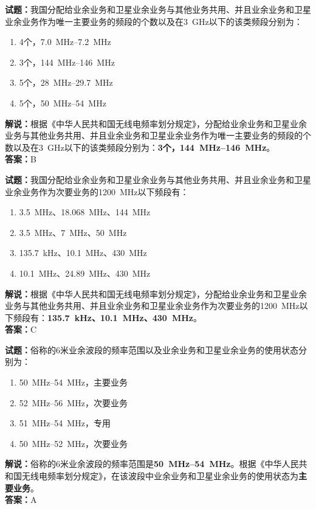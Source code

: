 \documentclass{ctexbook}
\begin{document}
\vspace{\baselineskip}

\noindent\textbf{试题：}我国分配给业余业务和卫星业余业务与其他业务共用、并且业余业务和卫星业余业务作为唯一主要业务的频段的个数以及在\qty{3}{\GHz}以下的该类频段分别为：
\begin{enumerate}[leftmargin=3em]
  \item 4个，\qtyrange[range-phrase=--]{7.0}{7.2}{\MHz}
  \item 3个，\qtyrange[range-phrase=--]{144}{146}{\MHz}
  \item 5个，\qtyrange[range-phrase=--]{28}{29.7}{\MHz}
  \item 5个，\qtyrange[range-phrase=--]{50}{54}{\MHz}
\end{enumerate}
\noindent\textbf{解说：}根据《中华人民共和国无线电频率划分规定》，分配给业余业务和卫星业余业务与其他业务共用、并且业余业务和卫星业余业务作为唯一主要业务的频段的个数以及在\qty{3}{\GHz}以下的该类频段分别为：\textbf{3个，\qtyrange[range-phrase=--]{144}{146}{\MHz}}。\\\noindent\textbf{答案：}B

\vspace{\baselineskip}

\noindent\textbf{试题：}我国分配给业余业务和卫星业余业务与其他业务共用、并且业余业务和卫星业余业务作为次要业务的\qty{1200}{\MHz}以下频段有：
\begin{enumerate}[leftmargin=3em]
  \item \qty{3.5}{\MHz}、\qty{18.068}{\MHz}、\qty{144}{\MHz}
  \item \qty{3.5}{\MHz}、\qty{7}{\MHz}、\qty{50}{\MHz}
  \item \qty{135.7}{\kHz}、\qty{10.1}{\MHz}、\qty{430}{\MHz}
  \item \qty{10.1}{\MHz}、\qty{24.89}{\MHz}、\qty{430}{\MHz}
\end{enumerate}
\noindent\textbf{解说：}根据《中华人民共和国无线电频率划分规定》，分配给业余业务和卫星业余业务与其他业务共用、并且业余业务和卫星业余业务作为次要业务的\qty{1200}{\MHz}以下频段有：\textbf{\qty{135.7}{\kHz}、\qty{10.1}{\MHz}、\qty{430}{\MHz}}。\\\noindent\textbf{答案：}C

\vspace{\baselineskip}

\noindent\textbf{试题：}俗称的6米业余波段的频率范围以及业余业务和卫星业余业务的使用状态分别为：
\begin{enumerate}[leftmargin=3em]
  \item \qtyrange[range-phrase=--]{50}{54}{\MHz}，主要业务
  \item \qtyrange[range-phrase=--]{52}{56}{\MHz}，次要业务
  \item \qtyrange[range-phrase=--]{51}{54}{\MHz}，专用
  \item \qtyrange[range-phrase=--]{50}{52}{\MHz}，次要业务
\end{enumerate}
\noindent\textbf{解说：}俗称的6米业余波段的频率范围是\textbf{\qtyrange[range-phrase=--]{50}{54}{\MHz}}。根据《中华人民共和国无线电频率划分规定》，在该波段中业余业务和卫星业余业务的使用状态为\textbf{主要业务}。\\\noindent\textbf{答案：}A
\end{document}
